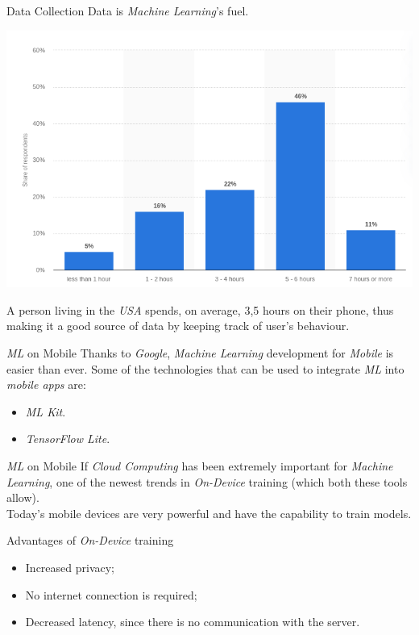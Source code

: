 \documentclass[dvipsnames, handout]{beamer}
\newcommand{\1}{\mathds{1}}	%
\begin{document}
\begin{frame}{Data Collection}
Data is \emph{Machine Learning}'s fuel.
\pause
\begin{center}
\pause
\includegraphics[scale=0.3]{presentation/Screenshot from 2021-05-25 13-06-19.png}
\end{center}
\pause
A person living in the \emph{USA} spends, on average, 3,5 hours on their phone, thus making it a good source of data by keeping track of user's behaviour. 
\end{frame}

\begin{frame}{\emph{ML} on Mobile}
Thanks to \emph{Google}, \emph{Machine Learning} development for \emph{Mobile} is easier than ever.
\pause
Some of the technologies that can be used to integrate \emph{ML} into \emph{mobile apps} are:
\begin{itemize}
    \item \emph{ML Kit}.
    \item \emph{TensorFlow Lite}.
\end{itemize}
\pause
\end{frame}

\begin{frame}{\emph{ML} on Mobile}
If \emph{Cloud Computing} has been extremely important for \emph{Machine Learning}, one of the newest trends in \emph{On-Device} training (which both these tools allow).\\
\pause
Today's mobile devices are very powerful and have the capability to train models.
\end{frame}

\begin{frame}{Advantages of \emph{On-Device} training}
\begin{itemize}
    \item Increased privacy;
    \item No internet connection is required;
    \item Decreased latency, since there is no communication with the server. 
\end{itemize}
\end{frame}
\end{document}
